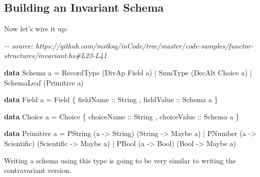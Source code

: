 \documentclass[]{article}
\newenvironment{Shaded}{}{}
\newcommand{\CommentTok}[1]{\textcolor[rgb]{0.38,0.63,0.69}{\textit{#1}}}
\newcommand{\DataTypeTok}[1]{\textcolor[rgb]{0.56,0.13,0.00}{#1}}
\newcommand{\KeywordTok}[1]{\textcolor[rgb]{0.00,0.44,0.13}{\textbf{#1}}}
\newcommand{\NormalTok}[1]{#1}
\newcommand{\OperatorTok}[1]{\textcolor[rgb]{0.40,0.40,0.40}{#1}}
\newcommand{\OtherTok}[1]{\textcolor[rgb]{0.00,0.44,0.13}{#1}}
\begin{document}
\hypertarget{building-an-invariant-schema}{%
\subsection{Building an Invariant Schema}\label{building-an-invariant-schema}}

Now let's wire it up:

\begin{Shaded}
\begin{Highlighting}[]
\CommentTok{{-}{-} source: https://github.com/mstksg/inCode/tree/master/code{-}samples/functor{-}structures/invariant.hs\#L23{-}L41}

\KeywordTok{data} \DataTypeTok{Schema}\NormalTok{ a }\OtherTok{=}
      \DataTypeTok{RecordType}\NormalTok{  (}\DataTypeTok{DivAp}   \DataTypeTok{Field}\NormalTok{  a)}
    \OperatorTok{|} \DataTypeTok{SumType}\NormalTok{     (}\DataTypeTok{DecAlt} \DataTypeTok{Choice}\NormalTok{ a)}
    \OperatorTok{|} \DataTypeTok{SchemaLeaf}\NormalTok{  (}\DataTypeTok{Primitive}\NormalTok{ a)}

\KeywordTok{data} \DataTypeTok{Field}\NormalTok{ a }\OtherTok{=} \DataTypeTok{Field}
\NormalTok{    \{}\OtherTok{ fieldName  ::} \DataTypeTok{String}
\NormalTok{    ,}\OtherTok{ fieldValue ::} \DataTypeTok{Schema}\NormalTok{ a}
\NormalTok{    \}}

\KeywordTok{data} \DataTypeTok{Choice}\NormalTok{ a }\OtherTok{=} \DataTypeTok{Choice}
\NormalTok{    \{}\OtherTok{ choiceName  ::} \DataTypeTok{String}
\NormalTok{    ,}\OtherTok{ choiceValue ::} \DataTypeTok{Schema}\NormalTok{ a}
\NormalTok{    \}}

\KeywordTok{data} \DataTypeTok{Primitive}\NormalTok{ a }\OtherTok{=}
      \DataTypeTok{PString}\NormalTok{ (a }\OtherTok{{-}>} \DataTypeTok{String}\NormalTok{)     (}\DataTypeTok{String}     \OtherTok{{-}>} \DataTypeTok{Maybe}\NormalTok{ a)}
    \OperatorTok{|} \DataTypeTok{PNumber}\NormalTok{ (a }\OtherTok{{-}>} \DataTypeTok{Scientific}\NormalTok{) (}\DataTypeTok{Scientific} \OtherTok{{-}>} \DataTypeTok{Maybe}\NormalTok{ a)}
    \OperatorTok{|} \DataTypeTok{PBool}\NormalTok{   (a }\OtherTok{{-}>} \DataTypeTok{Bool}\NormalTok{)       (}\DataTypeTok{Bool}       \OtherTok{{-}>} \DataTypeTok{Maybe}\NormalTok{ a)}
\end{Highlighting}
\end{Shaded}

Writing a schema using this type is going to be very similar to writing the
contravariant version.
\end{document}
